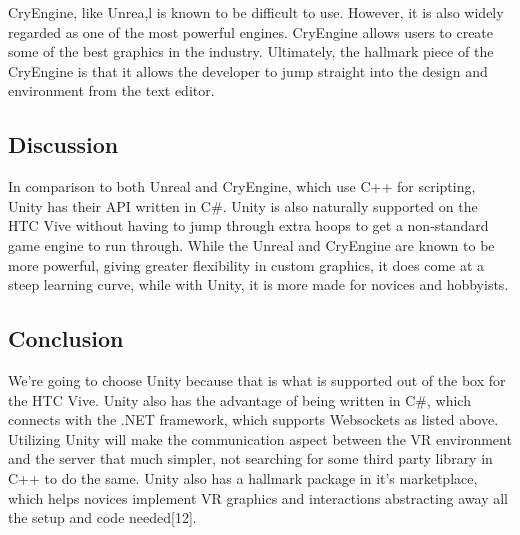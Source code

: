 \documentclass[onecolumn, draftclsnofoot,10pt, compsoc]{IEEEtran}
\begin{document}
        CryEngine, like Unrea,l is known to be difficult to use. However, it is also widely regarded as one of the most powerful engines. CryEngine allows users to create some of the best graphics in the industry. Ultimately, the hallmark piece of the CryEngine is that it allows the developer to jump straight into the design and environment from the text editor. 


    \subsection{Discussion}
        In comparison to both Unreal and CryEngine, which use C++ for scripting, Unity has their API written in C\#. Unity is also naturally supported on the HTC Vive without having to jump through extra hoops to get a non-standard game engine to run through.  While the Unreal and CryEngine are known to be more powerful, giving greater flexibility in custom graphics, it does come at a steep learning curve, while with Unity, it is more made for novices and hobbyists. 

    \subsection{Conclusion}
        
        We’re going to choose Unity because that is what is supported out of the box for the HTC Vive. Unity also has the advantage of being written in C\#, which connects with the .NET framework, which supports Websockets as listed above. Utilizing Unity will make the communication aspect between the VR environment and the server that much simpler, not searching for some third party library in C++ to do the same. Unity also has a hallmark package in it’s marketplace, which helps novices implement VR graphics and interactions abstracting away all the setup and code needed[12]. 



\newpage
\end{document}
